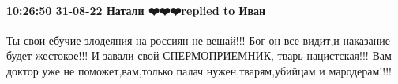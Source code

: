  
 
 
 
 

\paragraph{10:26:50 31-08-22 Натали ❤️❤️❤️replied to Иван}

Ты свои ебучие злодеяния на россиян не вешай!!! Бог он все видит,и наказание
будет жестокое!!! И завали свой СПЕРМОПРИЕМНИК, тварь нацистская!!! Вам доктор
уже не поможет,вам,только палач нужен,тварям,убийцам и мародерам!!!!
